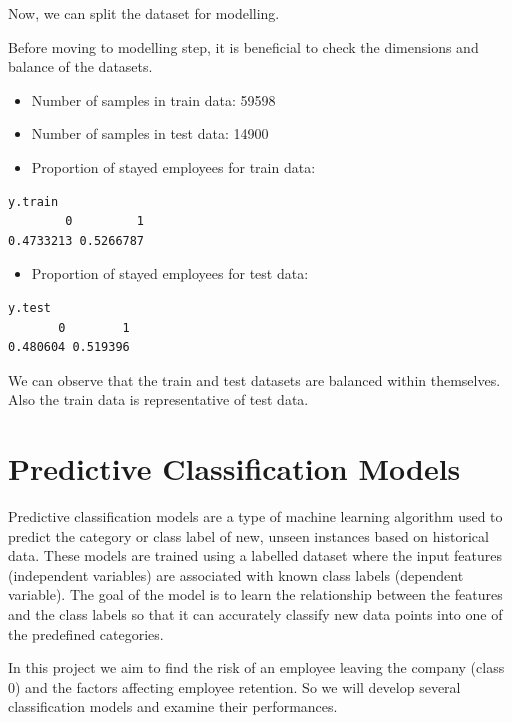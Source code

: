 \documentclass[
  10pt,
  paper=a4,
  ,captions=tableheading
]{scrartcl}
\providecommand{\tightlist}{%
  \setlength{\itemsep}{0pt}\setlength{\parskip}{0pt}}
\begin{document}
\small

Now, we can split the dataset for modelling.

Before moving to modelling step, it is beneficial to check the
dimensions and balance of the datasets.

\begin{itemize}
\item
  Number of samples in train data: 59598
\item
  Number of samples in test data: 14900
\item
  Proportion of stayed employees for train data:
\end{itemize}

\small

\begin{verbatim}
y.train
        0         1 
0.4733213 0.5266787 
\end{verbatim}

\small

\begin{itemize}
\tightlist
\item
  Proportion of stayed employees for test data:
\end{itemize}

\small

\begin{verbatim}
y.test
       0        1 
0.480604 0.519396 
\end{verbatim}

\small

We can observe that the train and test datasets are balanced within
themselves. Also the train data is representative of test data.

\section{Predictive Classification
Models}\label{predictive-classification-models}

Predictive classification models are a type of machine learning
algorithm used to predict the category or class label of new, unseen
instances based on historical data. These models are trained using a
labelled dataset where the input features (independent variables) are
associated with known class labels (dependent variable). The goal of the
model is to learn the relationship between the features and the class
labels so that it can accurately classify new data points into one of
the predefined categories.

In this project we aim to find the risk of an employee leaving the
company (class 0) and the factors affecting employee retention. So we
will develop several classification models and examine their
performances.
\end{document}
